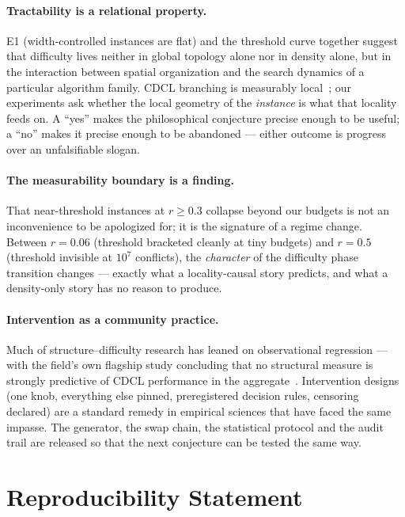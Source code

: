 \documentclass[11pt]{article}
\begin{document}
\paragraph{Tractability is a relational property.}
E1 (width-controlled instances are flat) and the threshold curve together
suggest that difficulty lives neither in global topology alone nor in density
alone, but in the interaction between spatial organization and the search
dynamics of a particular algorithm family. CDCL branching is measurably
local~\cite{zulkoski2018}; our experiments ask whether the local geometry of
the \emph{instance} is what that locality feeds on. A ``yes'' makes the
philosophical conjecture precise enough to be useful; a ``no'' makes it
precise enough to be abandoned --- either outcome is progress over an
unfalsifiable slogan.

\paragraph{The measurability boundary is a finding.}
That near-threshold instances at $r\ge0.3$ collapse beyond our budgets is not
an inconvenience to be apologized for; it is the signature of a regime
change. Between $r=0.06$ (threshold bracketed cleanly at tiny budgets) and
$r=0.5$ (threshold invisible at $10^7$ conflicts), the \emph{character} of the
difficulty phase transition changes --- exactly what a locality-causal story
predicts, and what a density-only story has no reason to produce.

\paragraph{Intervention as a community practice.}
Much of structure--difficulty research has leaned on observational
regression --- with the field's own flagship study concluding that no structural
measure is strongly predictive of CDCL performance in the
aggregate~\cite{zulkoski2018}.
Intervention designs (one knob, everything else pinned, preregistered
decision rules, censoring declared) are a standard remedy in empirical
sciences that have faced the same impasse. The generator, the swap
chain, the statistical protocol and the audit trail are released so that the
next conjecture can be tested the same way.

\section{Reproducibility Statement}
\label{sec:repro}
\end{document}
